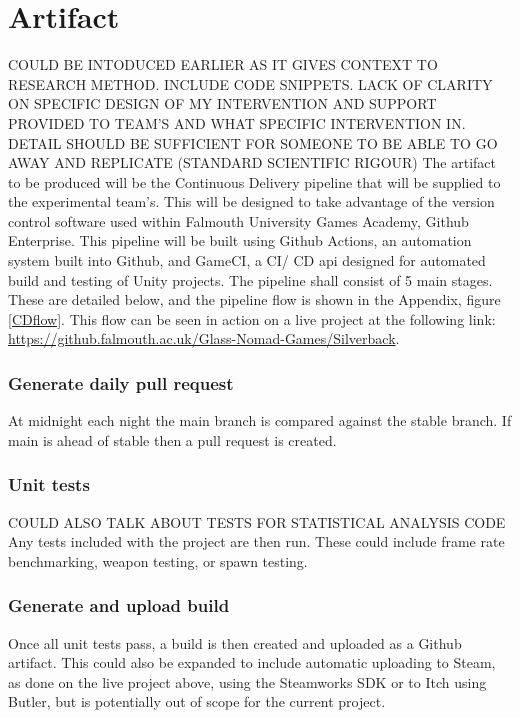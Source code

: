 \documentclass[journal]{IEEEtran}
\begin{document}
\section{Artifact}
COULD BE INTODUCED EARLIER AS IT GIVES CONTEXT TO RESEARCH METHOD. INCLUDE CODE SNIPPETS. LACK OF CLARITY ON SPECIFIC DESIGN OF MY INTERVENTION AND SUPPORT PROVIDED TO TEAM'S AND WHAT SPECIFIC INTERVENTION IN. DETAIL SHOULD BE SUFFICIENT FOR SOMEONE TO BE ABLE TO GO AWAY AND REPLICATE (STANDARD SCIENTIFIC RIGOUR)
The artifact to be produced will be the Continuous Delivery pipeline that will be supplied to the experimental team's. This will be designed to take advantage of the version control software used within Falmouth University Games Academy, Github Enterprise\cite{gitenterprise}. This pipeline will be built using Github Actions\cite{gitactions}, an automation system built into Github, and GameCI\cite{gameci}, a CI/ CD api designed for automated build and testing of Unity projects. The pipeline shall consist of 5 main stages. These are detailed below, and the pipeline flow is shown in the Appendix, figure \ref{CDflow}. This flow can be seen in action on a live project at the following link: \url{https://github.falmouth.ac.uk/Glass-Nomad-Games/Silverback}.\\

\subsubsection*{Generate daily pull request}
At midnight each night the main branch is compared against the stable branch. If main is ahead of stable then a pull request is created.\\

\subsubsection*{Unit tests}
COULD ALSO TALK ABOUT TESTS FOR STATISTICAL ANALYSIS CODE
Any tests included with the project are then run. These could include frame rate benchmarking, weapon testing, or spawn testing.\\

\subsubsection*{Generate and upload build}
Once all unit tests pass, a build is then created and uploaded as a Github artifact\cite{gitartifacts}. This could also be expanded to include automatic uploading to Steam, as done on the live project above, using the Steamworks SDK\cite{steamupload} or to Itch using Butler\cite{itchupload}, but is potentially out of scope for the current project.\\
\end{document}
